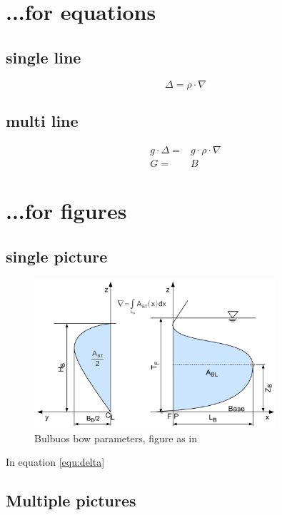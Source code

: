 \section{...for equations}
\subsection{single line}
\begin{equation}
 \Delta=\rho\cdot\nabla \label{equ:T}
\end{equation}

\subsection{multi line}
\begin{eqnarray}
 g\cdot\Delta=&g\cdot\rho\cdot\nabla\\
 G =& B \label{equ:delta}
\end{eqnarray}
\clearpage


\section{...for figures}\label{sec:tables}

\subsection{single picture}
\begin{figure}[t]
\centering
  \includegraphics[width=0.8\textwidth]{./figures/bugwulst_abmessungen2.pdf}
  \caption[Bulbuos bow parameter]{Bulbuos bow parameters, figure as in \cite{Kracht}}\label{fig:bulbuosBowKracht}
\end{figure}

In equation \eqref{equ:delta}

\subsection{Multiple pictures}

